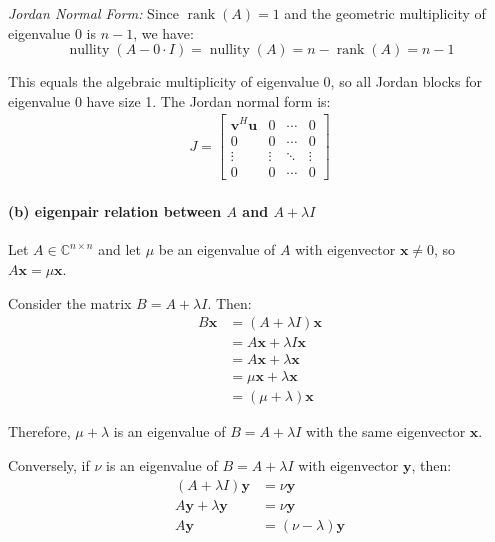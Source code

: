 \emph{Jordan Normal Form:} Since $\operatorname{rank}(A) = 1$ and the geometric multiplicity of eigenvalue 0 is $n-1$, we have:
\[
    \operatorname{nullity}\left(A- 0 \cdot I\right) = \operatorname{nullity}(A) = n - \operatorname{rank}(A) = n - 1
\]

This equals the algebraic multiplicity of eigenvalue 0, so all Jordan blocks for eigenvalue 0 have size 1.
The Jordan normal form is:
\begin{align*}
    J = \begin{bmatrix}
            \mathbf{v}^H \mathbf{u} & 0      & \cdots & 0      \\
            0                       & 0      & \cdots & 0      \\
            \vdots                  & \vdots & \ddots & \vdots \\
            0                       & 0      & \cdots & 0
        \end{bmatrix}
\end{align*}

\paragraph*{(b) eigenpair relation between $A$ and $A + \lambda I$}

Let $A \in \mathbb{C}^{n \times n}$ and let $\mu$ be an eigenvalue of $A$ with eigenvector $\mathbf{x} \neq 0$, so $A\mathbf{x} = \mu\mathbf{x}$.

Consider the matrix $B = A + \lambda I$. Then:
\begin{align*}
    B\mathbf{x} & = \left(A+ \lambda I\right)\mathbf{x} \\
                & = A\mathbf{x} + \lambda I\mathbf{x}   \\
                & = A\mathbf{x} + \lambda \mathbf{x}    \\
                & = \mu\mathbf{x} + \lambda \mathbf{x}  \\
                & = (\mu + \lambda)\mathbf{x}
\end{align*}

Therefore, $\mu + \lambda$ is an eigenvalue of $B = A + \lambda I$ with the same eigenvector $\mathbf{x}$.

Conversely, if $\nu$ is an eigenvalue of $B = A + \lambda I$ with eigenvector $\mathbf{y}$, then:
\begin{align*}
    \left(A+ \lambda I\right)\mathbf{y} & = \nu \mathbf{y}            \\
    A\mathbf{y} + \lambda \mathbf{y}    & = \nu \mathbf{y}            \\
    A\mathbf{y}                         & = (\nu - \lambda)\mathbf{y}
\end{align*}

